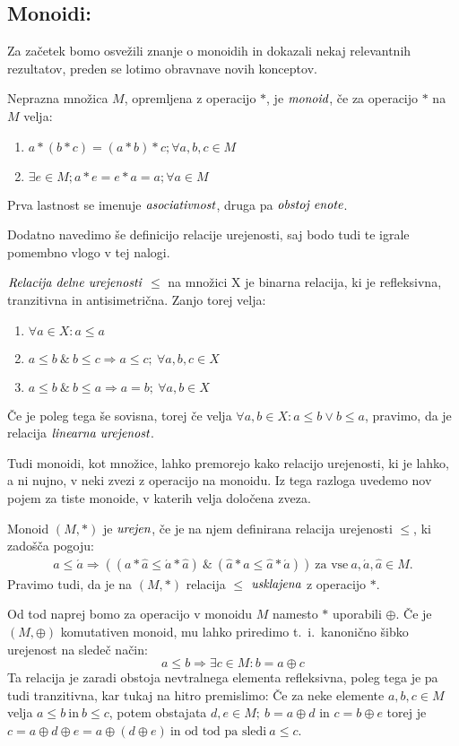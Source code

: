 \documentclass[mat1]{fmfdelo}
\newcommand{\pojem}[1]{\ensuremath{\emph{#1}}}
\begin{document}
\subsection{Monoidi:}\label{subsect:monoid}
Za začetek bomo osvežili znanje o monoidih in dokazali nekaj relevantnih rezultatov, preden se lotimo obravnave novih konceptov. 
\begin{definicija}
	Neprazna množica $M$, opremljena z operacijo $\ast$, je \pojem{monoid}, če za operacijo $\ast$ na $M$ velja:
	\begin{enumerate}
		\item $a \ast (b \ast c) = (a\ast b) \ast c;\forall a, b, c \in M$
		\item $\exists e\in M; a \ast e = e\ast a = a;\forall a\in M$
	\end{enumerate}
	Prva lastnost se imenuje \pojem{asociativnost}, druga pa \pojem{obstoj enote}. 
\end{definicija}
Dodatno navedimo še definicijo relacije urejenosti, saj bodo tudi te igrale pomembno vlogo v tej nalogi.
\begin{definicija}
	\pojem{Relacija delne urejenosti} $\leq$ na množici X je binarna relacija, ki je refleksivna, tranzitivna in antisimetrična. Zanjo torej velja:
	\begin{enumerate}
		\item $\forall a \in X: a \leq a$
		\item $a\leq b~\&~b\leq c \Rightarrow a\leq c;~\forall a, b, c\in X$
		\item $a\leq b~\&~b\leq a \Rightarrow a = b;~\forall a, b\in X$
	\end{enumerate}
Če je poleg tega še sovisna, torej če velja $\forall a, b \in X: a \leq b \lor b \leq a$, pravimo, da je relacija \pojem{linearna urejenost}.
\end{definicija}
Tudi monoidi, kot množice, lahko premorejo kako relacijo urejenosti, ki je lahko, a ni nujno, v neki zvezi z operacijo na monoidu. Iz tega razloga uvedemo nov pojem za tiste monoide, v katerih velja določena zveza.
\begin{definicija}
	Monoid $(M, \ast)$ je \pojem{urejen}, če je na njem definirana relacija urejenosti $\leq$, ki zadošča pogoju: \begin{align*} 
	a \leq \acute{a} \Rightarrow ((a \ast \hat{a} \leq \acute{a} \ast \hat{a})~\&~(\hat{a} \ast a \leq \hat{a}\ast \acute{a})) ~\text{za vse}~a, \acute{a},\hat{a}\in M.
\end{align*}
	Pravimo tudi, da je na $(M, \ast)$ relacija $\leq$ \pojem{usklajena} z operacijo $\ast$.
\end{definicija}
Od tod naprej bomo za operacijo v monoidu $M$ namesto $\ast$ uporabili $\oplus$.
Če je $(M, \oplus)$ komutativen monoid, mu lahko priredimo t.~i.~kanonično šibko urejenost na sledeč način: $$a \leq b \Rightarrow \exists c\in M: b = a \oplus c$$ Ta relacija je zaradi obstoja nevtralnega elementa refleksivna, poleg tega je pa tudi tranzitivna, kar tukaj na hitro premislimo: Če za neke elemente $a, b, c\in M$ velja $a\leq b~\text{in}~b\leq c$, potem obstajata $d, e\in M;~b = a \oplus d$ in $c = b\oplus e$ torej je $c = a\oplus d\oplus e = a\oplus (d \oplus e)~\text{in od tod pa sledi}~ a \leq c$.
	
\end{document}
